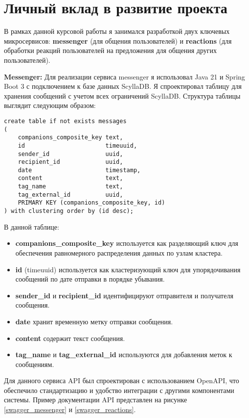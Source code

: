\section{Личный вклад в развитие проекта}

В рамках данной курсовой работы я занимался разработкой двух ключевых микросервисов: \textbf{messenger} (для общения пользователей) и \textbf{reactions} (для обработки реакций пользователей на предложения для общения других пользователей).

\textbf{Messenger:} 
Для реализации сервиса messenger я использовал Java 21 и Spring Boot 3 с подключением к базе данных ScyllaDB. Я спроектировал таблицу для хранения сообщений с учетом всех ограничений ScyllaDB. Структура таблицы выглядит следующим образом:

\begin{verbatim}
create table if not exists messages
(
    companions_composite_key text,
    id                       timeuuid,
    sender_id                uuid,
    recipient_id             uuid,
    date                     timestamp,
    content                  text,
    tag_name                 text,
    tag_external_id          uuid,
    PRIMARY KEY (companions_composite_key, id)
) with clustering order by (id desc);
\end{verbatim}

В данной таблице:
\begin{itemize}
    \item \textbf{companions\_composite\_key} используется как разделяющий ключ для обеспечения равномерного распределения данных по узлам кластера.
    \item \textbf{id} (timeuuid) используется как кластеризующий ключ для упорядочивания сообщений по дате отправки в порядке убывания.
    \item \textbf{sender\_id} и \textbf{recipient\_id} идентифицируют отправителя и получателя сообщения.
    \item \textbf{date} хранит временную метку отправки сообщения.
    \item \textbf{content} содержит текст сообщения.
    \item \textbf{tag\_name} и \textbf{tag\_external\_id} используются для добавления меток к сообщениям.
\end{itemize}

Для данного сервиса API был спроектирован с использованием OpenAPI, что обеспечило стандартизацию и удобство интеграции с другими компонентами системы. Пример документации API представлен на рисунке \ref{swagger_messenger} и \ref{swagger_reactions}.

